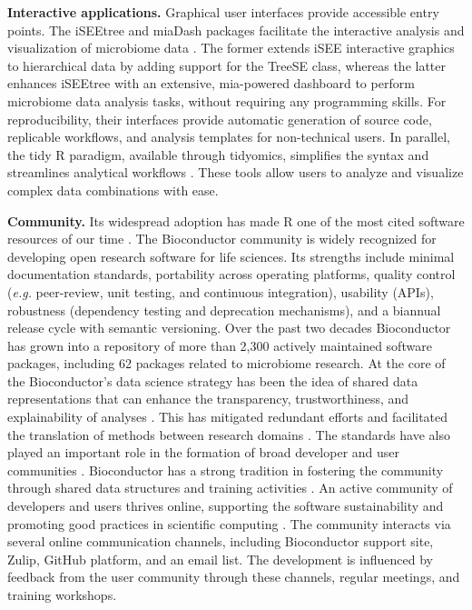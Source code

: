 \documentclass[
  sn-nature,
]{sn-jnl}
\begin{document}
\textbf{Interactive applications.} Graphical user interfaces provide
accessible entry points. The iSEEtree and miaDash packages facilitate
the interactive analysis and visualization of microbiome data
\citep{benedetti2025}. The former extends iSEE interactive graphics to
hierarchical data by adding support for the TreeSE class, whereas the
latter enhances iSEEtree with an extensive, mia-powered dashboard to
perform microbiome data analysis tasks, without requiring any
programming skills. For reproducibility, their interfaces provide
automatic generation of source code, replicable workflows, and analysis
templates for non-technical users. In parallel, the tidy R paradigm,
available through tidyomics, simplifies the syntax and streamlines
analytical workflows \citep{hutchison2024}. These tools allow users to
analyze and visualize complex data combinations with ease.

\textbf{Community.} Its widespread adoption has made R one of the most
cited software resources of our time \citep{pearson2025}. The
Bioconductor community is widely recognized for developing open research
software for life sciences. Its strengths include minimal documentation
standards, portability across operating platforms, quality control
(\emph{e.g.} peer-review, unit testing, and continuous integration),
usability (APIs), robustness (dependency testing and deprecation
mechanisms), and a biannual release cycle with semantic versioning. Over
the past two decades Bioconductor has grown into a repository of more
than 2,300 actively maintained software packages, including 62 packages
related to microbiome research. At the core of the Bioconductor's data
science strategy has been the idea of shared data representations that
can enhance the transparency, trustworthiness, and explainability of
analyses \citep{gentleman2004, lawrence2013}. This has mitigated
redundant efforts and facilitated the translation of methods between
research domains \citep{delia2023, barker2022}. The standards have also
played an important role in the formation of broad developer and user
communities \citep{drnevich2025}. Bioconductor has a strong tradition in
fostering the community through shared data structures and training
activities \citep{drnevich2025}. An active community of developers and
users thrives online, supporting the software sustainability and
promoting good practices in scientific computing \citep{wilson2017}. The
community interacts via several online communication channels, including
Bioconductor support site, Zulip, GitHub platform, and an email list.
The development is influenced by feedback from the user community
through these channels, regular meetings, and training workshops.
\end{document}
